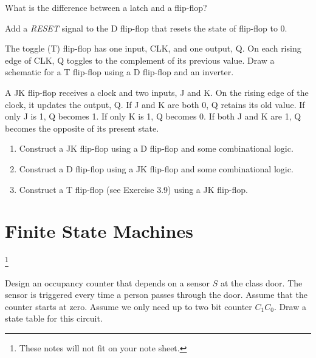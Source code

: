 \begin{remark}
  What is the difference between a latch and a flip-flop?
\end{remark}
\vspace{5em}

\begin{example}
  Add a \emph{RESET} signal to the D flip-flop that resets the state of flip-flop to 0.
\end{example}
\vspace{20em}

\begin{example}
  The toggle (T) flip-flop has one input, CLK, and one output, Q. On
  each rising edge of CLK, Q toggles to the complement of its previous value. Draw
  a schematic for a T flip-flop using a D flip-flop and an inverter.
\end{example}
\vspace{20em}

\begin{prob}
  A JK flip-flop receives a clock and two inputs, J and K. On the rising
  edge of the clock, it updates the output, Q. If J and K are both 0, Q retains its old
  value. If only J is 1, Q becomes 1. If only K is 1, Q becomes 0. If both J and K are 1,
  Q becomes the opposite of its present state.
  \begin{enumerate}
  \item Construct a JK flip-flop using a D flip-flop and some combinational logic.
  \item Construct a D flip-flop using a JK flip-flop and some combinational logic.
  \item Construct a T flip-flop (see Exercise 3.9) using a JK flip-flop.
  \end{enumerate}
\end{prob}


\section{Finite State Machines~\cite[Sec~3.4]{harris2022digital}}\footnote{These
  notes will not fit on your note sheet.}

\begin{example}
  Design an occupancy counter that depends on a
  sensor $S$ at the class door. The sensor is triggered every time a person passes
  through the door. Assume that the counter starts at zero. Assume
  we only need up to two bit counter $C_1C_0$. Draw a state table for this
  circuit.
\end{example}

